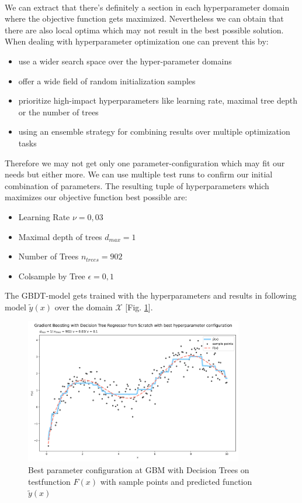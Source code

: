 \documentclass[12pt, a4paper]{article}
\begin{document}
\\
We can extract that there's definitely a section in each hyperparameter domain where the objective function gets maximized. Nevertheless we can obtain that there are also local optima which may not result in the best possible solution. When dealing with hyperparameter optimization one can prevent this by:
\begin{itemize}
    \item use a wider search space over the hyper-parameter domains
    \item offer a wide field of random initialization samples
    \item prioritize high-impact hyperparameters like learning rate, maximal tree depth or the number of trees
    \item using an ensemble strategy for combining results over multiple optimization tasks
\end{itemize}
Therefore we may not get only one parameter-configuration which may fit our needs but either more. We can use multiple test runs to confirm our initial combination of parameters. The resulting tuple of hyperparameters which maximizes our objective function best possible are:
\begin{itemize}
    \item Learning Rate $\nu = 0{,}03$
    \item Maximal depth of trees $d_{max} = 1$
    \item Number of Trees $n_{trees} = 902$
    \item Colsample by Tree $\epsilon = 0{,}1$
\end{itemize}
The GBDT-model gets trained with the hyperparameters and results in following model $\tilde{y}(x)$ over the domain $\mathcal{X}$ [Fig. \ref{fig: gbm_dt_best_par}].
\begin{figure}[!htpb]
    \centering
    \includegraphics[width=0.85\textwidth,trim={0 0 0 0},clip]{figures/gbm_with_decision_tree_best_parameters.png}
    \caption[Best parameter configuration at GBM with Decision Trees on testfunction]{Best parameter configuration at GBM with Decision Trees on testfunction $F(x)$ with sample points and predicted function $\tilde{y}(x)$}
    \label{fig: gbm_dt_best_par}
\end{figure}
\newpage
\end{document}
